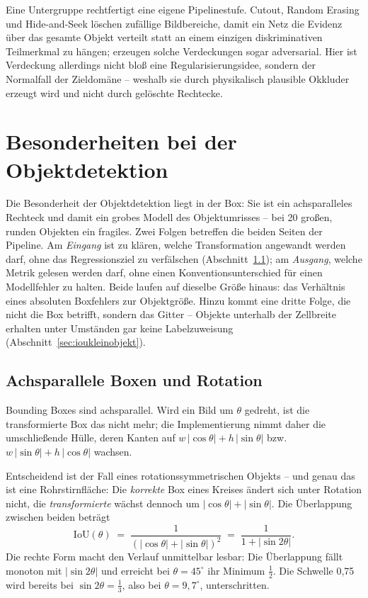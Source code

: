 Eine Untergruppe rechtfertigt eine eigene Pipelinestufe. Cutout, Random Erasing
und Hide-and-Seek löschen zufällige Bildbereiche, damit ein Netz die Evidenz über
das gesamte Objekt verteilt statt an einem einzigen diskriminativen Teilmerkmal
zu hängen; \textcite{wang2017afastrcnn} erzeugen solche Verdeckungen sogar
adversarial. Hier ist Verdeckung allerdings nicht bloß eine Regularisierungsidee,
sondern der Normalfall der Zieldomäne -- weshalb sie durch physikalisch plausible
Okkluder erzeugt wird und nicht durch gelöschte Rechtecke.

\section{Besonderheiten bei der Objektdetektion}
\label{sec:augdetektion}

Die Besonderheit der Objektdetektion liegt in der Box: Sie ist ein achsparalleles
Rechteck und damit ein grobes Modell des Objektumrisses -- bei 20\px{} großen,
runden Objekten ein fragiles. Zwei Folgen betreffen die beiden Seiten der
Pipeline. Am \emph{Eingang} ist zu klären, welche Transformation angewandt werden
darf, ohne das Regressionsziel zu verfälschen
(Abschnitt~\ref{sec:boxrotation}); am \emph{Ausgang}, welche Metrik gelesen
werden darf, ohne einen Konventionsunterschied für einen Modellfehler zu halten.
Beide laufen auf dieselbe Größe hinaus: das Verhältnis eines absoluten
Boxfehlers zur Objektgröße. Hinzu kommt eine dritte Folge, die nicht die Box
betrifft, sondern das Gitter -- Objekte unterhalb der Zellbreite erhalten unter
Umständen gar keine Labelzuweisung (Abschnitt~\ref{sec:ioukleinobjekt}).

\subsection{Achsparallele Boxen und Rotation}
\label{sec:boxrotation}

Bounding Boxes sind achsparallel. Wird ein Bild um $\theta$ gedreht, ist die
transformierte Box das nicht mehr; die Implementierung nimmt daher die
umschließende Hülle, deren Kanten auf $w\,|\cos\theta| + h\,|\sin\theta|$
bzw.\ $w\,|\sin\theta| + h\,|\cos\theta|$ wachsen.

Entscheidend ist der Fall eines rotationssymmetrischen Objekts -- und genau das
ist eine Rohrstirnfläche: Die \emph{korrekte} Box eines Kreises ändert sich unter
Rotation nicht, die \emph{transformierte} wächst dennoch um
$|\cos\theta| + |\sin\theta|$. Die Überlappung zwischen beiden beträgt
\begin{equation}
\mathrm{IoU}(\theta) \;=\; \frac{1}{(|\cos\theta| + |\sin\theta|)^2}
\;=\; \frac{1}{1 + |\sin 2\theta|}.
\label{eq:ioutheta}
\end{equation}
Die rechte Form macht den Verlauf unmittelbar lesbar: Die Überlappung fällt
monoton mit $|\sin 2\theta|$ und erreicht bei $\theta = 45^\circ$ ihr Minimum
$\tfrac12$. Die Schwelle 0,75 wird bereits bei $\sin 2\theta = \tfrac13$, also
bei $\theta = 9{,}7^\circ$, unterschritten.

